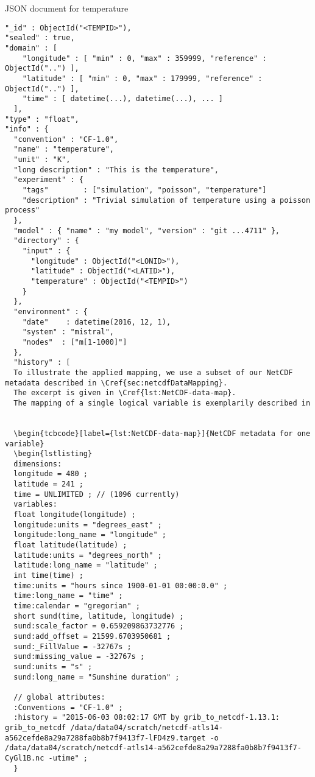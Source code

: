 \begin{tcbcode}[label={lst:mongotemperature}]{JSON document for temperature}
\begin{lstlisting}
"_id" : ObjectId("<TEMPID>"),
"sealed" : true,
"domain" : [
    "longitude" : [ "min" : 0, "max" : 359999, "reference" : ObjectId("..") ],
    "latitude" : [ "min" : 0, "max" : 179999, "reference" : ObjectId("..") ],
    "time" : [ datetime(...), datetime(...), ... ]
  ],
"type" : "float",
"info" : {
  "convention" : "CF-1.0",
  "name" : "temperature",
  "unit" : "K",
  "long description" : "This is the temperature",
  "experiment" : {
    "tags"        : ["simulation", "poisson", "temperature"]
    "description" : "Trivial simulation of temperature using a poisson process"
  },
  "model" : { "name" : "my model", "version" : "git ...4711" },
  "directory" : {
	"input" : {
	  "longitude" : ObjectId("<LONID>"),
	  "latitude" : ObjectId("<LATID>"),
	  "temperature" : ObjectId("<TEMPID>")
	}
  },
  "environment" : {
    "date"    : datetime(2016, 12, 1),
    "system" : "mistral",
    "nodes"  : ["m[1-1000]"]
  },
  "history" : [
  To illustrate the applied mapping, we use a subset of our NetCDF metadata described in \Cref{sec:netcdfDataMapping}.
  The excerpt is given in \Cref{lst:NetCDF-data-map}.
  The mapping of a single logical variable is exemplarily described in


  \begin{tcbcode}[label={lst:NetCDF-data-map}]{NetCDF metadata for one variable}
  \begin{lstlisting}
  dimensions:
  longitude = 480 ;
  latitude = 241 ;
  time = UNLIMITED ; // (1096 currently)
  variables:
  float longitude(longitude) ;
  longitude:units = "degrees_east" ;
  longitude:long_name = "longitude" ;
  float latitude(latitude) ;
  latitude:units = "degrees_north" ;
  latitude:long_name = "latitude" ;
  int time(time) ;
  time:units = "hours since 1900-01-01 00:00:0.0" ;
  time:long_name = "time" ;
  time:calendar = "gregorian" ;
  short sund(time, latitude, longitude) ;
  sund:scale_factor = 0.659209863732776 ;
  sund:add_offset = 21599.6703950681 ;
  sund:_FillValue = -32767s ;
  sund:missing_value = -32767s ;
  sund:units = "s" ;
  sund:long_name = "Sunshine duration" ;

  // global attributes:
  :Conventions = "CF-1.0" ;
  :history = "2015-06-03 08:02:17 GMT by grib_to_netcdf-1.13.1: grib_to_netcdf /data/data04/scratch/netcdf-atls14-a562cefde8a29a7288fa0b8b7f9413f7-lFD4z9.target -o /data/data04/scratch/netcdf-atls14-a562cefde8a29a7288fa0b8b7f9413f7-CyGl1B.nc -utime" ;
  }
  \end{lstlisting}
\end{tcbcode}

